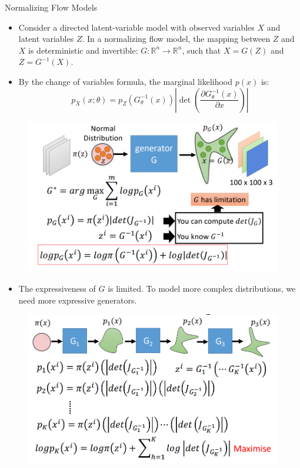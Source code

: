 \begin{frame}[allowframebreaks]{Normalizing Flow Models}
    \begin{itemize}
        \item Consider a directed latent-variable model with observed variables $X$ and latent variables $Z$. In a normalizing flow model, the mapping between $Z$ and $X$ is deterministic and invertible: $G:\mathbb{R}^n \rightarrow \mathbb{R}^n$, such that $X=G(Z)$ and $Z=G^{-1}(X)$.
        \item By the change of variables formula, the marginal likelihood $p(x)$ is:
        $$
        p_X(x;\theta) = p_Z(G_\theta^{-1}(x)) \left| \det \left( \frac{\partial G_\theta^{-1}(x)}{\partial x} \right) \right|
        $$
    \end{itemize}
\framebreak

\begin{figure}
    \centering
    \includegraphics[height=0.9\textheight, width=\textwidth, keepaspectratio]{images/norm-flow/nfm_2.png}
\end{figure}

\framebreak

\begin{itemize}
    \item The expressiveness of $G$ is limited. To model more complex distributions, we need more expressive generators.
\end{itemize}

\begin{figure}
    \centering
    \includegraphics[height=0.9\textheight, width=\textwidth, keepaspectratio]{images/norm-flow/nfm_3.png}
\end{figure}


\end{frame}
